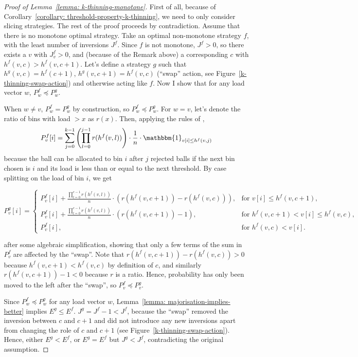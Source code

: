 \begin{proof}[Proof of Lemma~\ref{lemma: k-thinning-monotone}]
    First of all, because of Corollary~\ref{corollary: threshold-property-k-thinning}, we need to only consider slicing strategies.
    The rest of the proof proceeds by contradiction. Assume that there is no monotone optimal strategy. Take an optimal non-monotone strategy $f$, with the least number of inversions $J^f$. Since $f$ is not monotone, $J^f>0$, so there exists a $v$ with $J^f_v>0$, and (because of the Remark above) a corresponding $c$ with $h^f(v,c)>h^f(v,c+1)$. Let's define a strategy $g$ such that $h^g(v,c)=h^f(c+1)$, $h^g(v,c+1)=h^f(v,c)$ (``swap'' action, see Figure~\ref{k-thinning-swap-action}) and otherwise acting like $f$. Now I show that for any load vector $w$, $P^f_w \preccurlyeq P^g_w$.
    
    When $w\neq v$, $P^f_w=P^g_w$ by construction, so $P^f_w \preccurlyeq P^g_w$. For $w=v$, let's denote the ratio of bins with load $>x$ as $r(x)$. Then, applying the rules of \KThinning, $$P^f_v[i]=\sum_{j=0}^{k-1} \left(\prod_{l=0}^{j-1} r(h^f(v,l))\right)\cdot\frac{1}{n}\cdot\mathbbm{1}_{v[i]\leq h^f(v,j)}$$ because the ball can be allocated to bin $i$ after $j$ rejected balls if the next bin chosen is $i$ and its load is less than or equal to the next threshold. By case splitting on the load of bin $i$, we get
    
    $$P^g_v[i]= \begin{cases}
        P^f_v[i]+\frac{\prod_{l=0}^{c-1} r(h^f(v,l))}{n}\cdot(r(h^f(v,c+1))-r(h^f(v,c))), & \text{for } v[i]\leq h^f(v,c+1),\\
        P^f_v[i]+\frac{\prod_{l=0}^{c-1} r(h^f(v,l))}{n}\cdot(r(h^f(v,c+1))-1), & \text{for } h^f(v,c+1)<v[i]\leq h^f(v,c),\\
        P^f_v[i], & \text{for } h^f(v,c)<v[i].
    \end{cases}$$
    
    after some algebraic simplification, showing that only a few terms of the sum in $P_v^f$ are affected by the ``swap''. Note that $r(h^f(v,c+1))-r(h^f(v,c))>0$ because $h^f(v,c+1)<h^f(v,c)$ by definition of $c$, and similarly $r(h^f(v,c+1))-1<0$ because $r$ is a ratio. Hence, probability has only been moved to the left after the ``swap'', so $P^f_v \preccurlyeq P^g_v$.
    
    Since $P^f_w\preccurlyeq P^g_w$ for any load vector $w$, Lemma~\ref{lemma: majorisation-implies-better} implies $E^g\leq E^f$. $J^g=J^f-1<J^f$, because the ``swap'' removed the inversion between $c$ and $c+1$ and did not introduce any new inversions apart from changing the role of $c$ and $c+1$ (see Figure~\ref{k-thinning-swap-action}). Hence, either $E^g<E^f$, or $E^g=E^f$ but $J^g<J^f$, contradicting the original assumption.
\end{proof}


